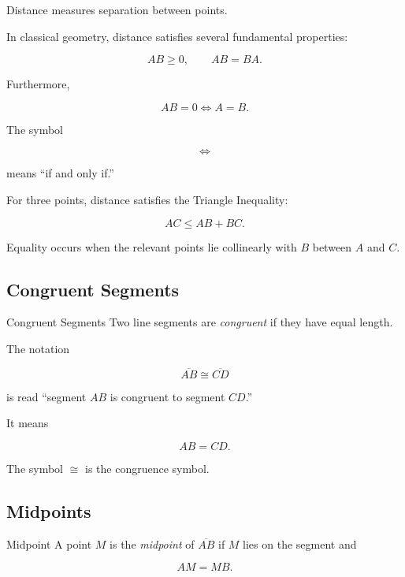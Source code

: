 Distance measures separation between points.

In classical geometry, distance satisfies several fundamental properties:

\[
AB\geq0,\qquad AB=BA.
\]

Furthermore,

\[ AB=0\iff A=B. \]

The symbol

\[ \iff \]

means ``if and only if.''

For three points, distance satisfies the Triangle Inequality:

\[ \boxed{AC\leq AB+BC.} \]

Equality occurs when the relevant points lie collinearly with \(B\) between
\(A\) and \(C\).

\subsection{Congruent Segments}
\label{subsec:congruent-segments}

\begin{definitionbox}{Congruent Segments}
Two line segments are \emph{congruent} if they have equal length.
\end{definitionbox}

The notation

\[ \overline{AB}\cong\overline{CD} \]

is read ``segment \(AB\) is congruent to segment \(CD\).''

It means

\[ AB=CD. \]

The symbol \(\cong\) is the congruence symbol.

\subsection{Midpoints}
\label{subsec:midpoints-euclidean}

\begin{definitionbox}{Midpoint}
A point \(M\) is the \emph{midpoint} of \(\overline{AB}\) if \(M\) lies on
the segment and

\[ AM=MB. \]
\end{definitionbox}

